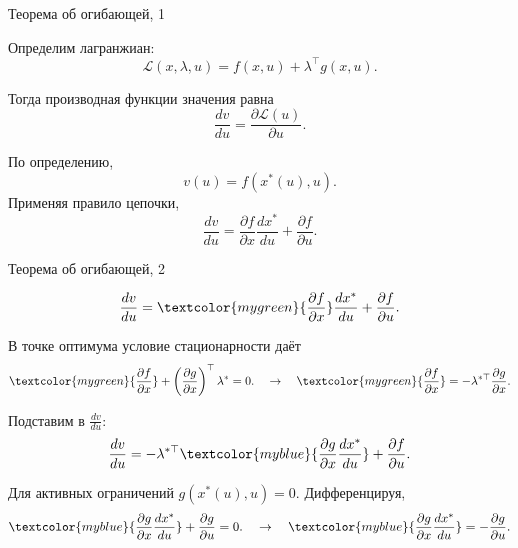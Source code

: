 \documentclass{beamer}
\begin{document}
\begin{frame}{Теорема об огибающей, 1}
	\begin{flushleft}
		
		Определим лагранжиан:
		\begin{equation}
			\mathcal{L}(x,\lambda,u) = f(x,u) + \lambda^\top g(x,u).
		\end{equation}
		
		Тогда производная функции значения равна
		\begin{equation*}
			\boxed{
				\frac{dv}{du}
				=
				\frac{\partial \mathcal{L}(u)}{\partial u}.}
		\end{equation*}
		
		По определению,
		\begin{equation}
			v(u) = f(x^*(u), u).
		\end{equation}
		Применяя правило цепочки,
		\begin{equation}
			\frac{dv}{du}
			=
			\frac{\partial f}{\partial x} \frac{dx^*}{du}
			+
			\frac{\partial f}{\partial u}.
		\end{equation}
		
	\end{flushleft}
\end{frame}

\begin{frame}{Теорема об огибающей, 2}
	\begin{flushleft}
		
		\begin{equation}
			\frac{dv}{du}
			=
			\textcolor{mygreen}{\frac{\partial f}{\partial x}} \frac{dx^*}{du}
			+
			\frac{\partial f}{\partial u}.
		\end{equation}
		
		В точке оптимума условие стационарности даёт
		\begin{equation}
			\textcolor{mygreen}{\frac{\partial f}{\partial x}} 
			+
			\left( \frac{\partial g}{\partial x} \right)^\top \lambda^*
			=
			0. 
			\quad \rightarrow \quad
			\textcolor{mygreen}{\frac{\partial f}{\partial x}} 
			=
			- \lambda^{*\top} \frac{\partial g}{\partial x}.
		\end{equation}
		
		Подставим в $\frac{dv}{du}$:
		\begin{equation}
			\frac{dv}{du}
			=
			- \lambda^{*\top} 
			\textcolor{myblue}{ \frac{\partial g}{\partial x} \frac{dx^*}{du}}
			+
			\frac{\partial f}{\partial u}.
		\end{equation}
		
		Для активных ограничений $g(x^*(u), u) = 0.$
		Дифференцируя,
		\begin{equation}
			\textcolor{myblue}{\frac{\partial g}{\partial x} \frac{dx^*}{du}}
			+
			\frac{\partial g}{\partial u}
			=
			0.
			\quad \rightarrow \quad
			\textcolor{myblue}{\frac{\partial g}{\partial x} \frac{dx^*}{du}}
			=
			- \frac{\partial g}{\partial u}.
		\end{equation}
		
	\end{flushleft}
\end{frame}
\end{document}
